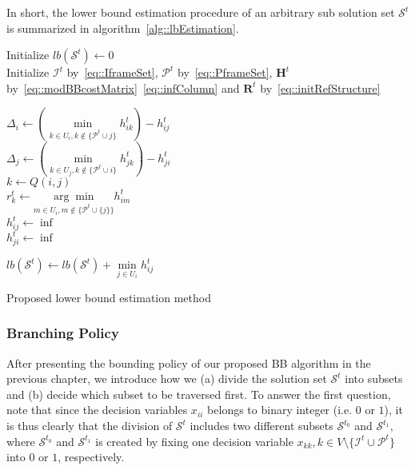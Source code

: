 %
In short, the lower bound estimation procedure of an arbitrary sub solution set $\mathcal{S}^t$ is summarized in algorithm~\ref{alg::lbEstimation}.
%
\IncMargin{1em}
\begin{algorithm}[]
 \SetAlgoLined
 \BlankLine
 Initialize $lb(\mathcal{S}^t) \gets 0$\\
 Initialize $\mathcal{I}^t$ by~\eqref{eq::IframeSet}, $\mathcal{P}^t$ by~\eqref{eq::PframeSet}, $\mathbf{H}^t$ by~\eqref{eq::modBBcostMatrix}~\eqref{eq::infColumn} and $\mathbf{R}^t$ by~\eqref{eq::initRefStructure} \\
 {
 	$\Delta_i \gets \left( \underset{k \in U_i, k \notin \{\mathcal{P}^t \cup j\}}{\min} h_{ik}^t \right) - h_{ij}^t$ \\
	$\Delta_j \gets \left( \underset{k \in U_j, k \notin \{\mathcal{P}^t \cup i\}}{\min} h_{jk}^t \right) - h_{ji}^t$ \\
 	$k \gets Q(i,j)$ \\
 	$r_k^t \gets \underset{m \in U_i, m \notin \{\mathcal{P}^t \cup \{j\}\}}{\arg \min} h_{im}^t$ \\
 	{
 		$h_{ij}^t \gets \inf$ \\
 	}
 	{
 		$h_{ji}^t \gets \inf$ \\
 	}
 	
 }
 {
 	$lb(\mathcal{S}^t) \gets lb(\mathcal{S}^t) + \underset{j \in U_i}{\min} h_{ij}^t$ \\
 }
 \caption{\label{alg::lbEstimation}Proposed lower bound estimation method}
\end{algorithm}
\DecMargin{1em}
%
\subsubsection{Branching Policy}
After presenting the bounding policy of our proposed BB algorithm in the previous chapter, we introduce how we (a) divide the solution set $\mathcal{S}^t$ into subsets and (b) decide which subset to be traversed first.
To answer the first question, note that since the decision variables $x_{ii}$ belongs to binary integer (i.e. $0$ or $1$), it is thus clearly that the division of $\mathcal{S}^t$ includes two different subsets $\mathcal{S}^{t_0}$ and $\mathcal{S}^{t_1}$, where  $\mathcal{S}^{t_0}$ and $\mathcal{S}^{t_1}$ is created by fixing one decision variable ${x_{kk},k \in V \setminus \{\mathcal{I}^t \cup \mathcal{P}^t\} }$ into $0$ or $1$, respectively.

